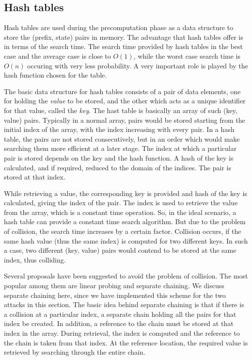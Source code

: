 
\subsection{Hash tables}
\label{sec:hash-tables}

Hash tables are used during the precomputation phase as a data structure to store the (prefix, state) pairs in memory. The advantage that hash tables offer is in terms of the search time. The search time provided by hash tables in the best case and the average case is close to $O(1)$, while the worst case search time is $O(n)$ occuring with very less probability. A very important role is played by the hash function chosen for the table. 

The basic data structure for hash tables consists of a pair of data elements, one for holding the \emph{value} to be stored, and the other which acts as a unique identifier for that value, called the \emph{key}. The hast table is basically an array of such (key, value) pairs. Typically in a normal array, pairs would be stored starting from the initial index of the array, with the index increasing with every pair. In a hash table, the pairs are not stored consecutively, but in an order which would make searching them more efficient at a later stage. The index at which a particular pair is stored depends on the key and the hash function. A hash of the key is calculated, and if required, reduced to the domain of the indices. The pair is stored at that index. 

While retrieving a value, the corresponding key is provided and hash of the key is calculated, giving the index of the pair. The index is used to retrieve the value from the array, which is a constant time operation. So, in the ideal scenario, a hash table can provide a constant time search algorithm. But due to the problem of collision, the search time increases by a certain factor. Collision occurs, if the same hash value (thus the same index) is computed for two different keys. In such a case, two different (key, value) pairs would contend to be stored at the same index, thus colliding.

Several proposals have been suggested to avoid the problem of collision. The most popular among them are linear probing and separate chaining. We discuss separate chaining here, since we have implemented this scheme for the two attacks in this section. The basic idea behind separate chaining is that if there is a collision at a particular index, a separate chain holding all the pairs for that index be created. In addition, a reference to the chain must be stored at that index in the array. During retrieval, the index is computed and the reference to the chain is taken from that index. At the reference location, the required value is retrieved by searching through the entire chain. 

